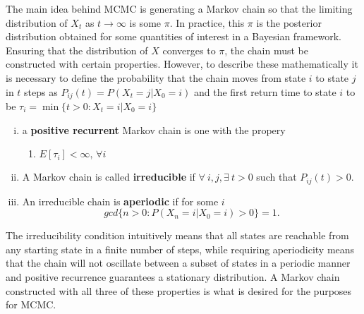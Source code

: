 
	

The main idea behind MCMC is generating a Markov chain so that the limiting distribution of $X_t$ as $t\rightarrow\infty$ is some $\pi$. 
In practice, this $\pi$ is the posterior distribution obtained for some quantities of interest in a Bayesian framework. 
Ensuring that the distribution of $X$ converges to $\pi$, the chain must be constructed with certain properties. However, to describe these mathematically it is necessary to define the probability that the chain moves from state $i$ to state $j$ in $t$ steps as $ P_{ij}(t) = P(X_t = j | X_0 = i)$
and the first return time to state $i$ to be $\tau_{i} = \min\{t>0:X_t = i|X_0 = i\}$
    \begin{enumerate}[(i)]
        \item a \textbf{positive recurrent} Markov chain is one with the propery
            \begin{enumerate}
                \item $E[\tau_{i}] < \infty ,\, \forall i$
            \end{enumerate}
        
        \item A Markov chain is called \textbf{irreducible} if $\forall~i,j, \exists~t > 0$ such that $P_{ij}(t) > 0$.
        \item An irreducible chain is \textbf{aperiodic} if for some $i$
            $$gcd\{n>0:P(X_n = i|X_0 = i) > 0\} =1. $$
    \end{enumerate}
The irreducibility condition intuitively means that all states are reachable from any starting state in a finite number of steps, while requiring aperiodicity means that the chain will not oscillate between a subset of states in a periodic manner and positive recurrence guarantees a stationary distribution. A Markov chain constructed with all three of these properties is what is desired for the purposes for MCMC.
